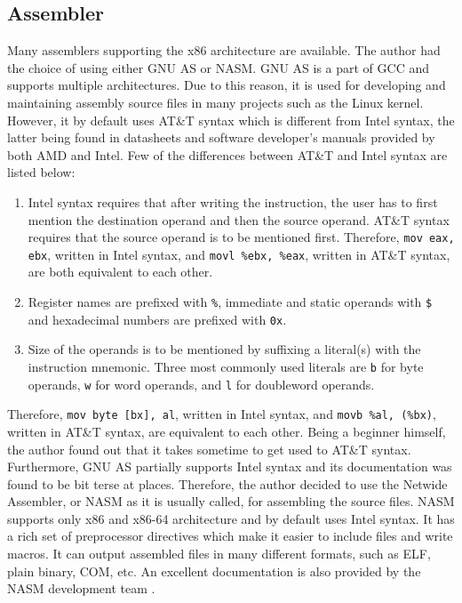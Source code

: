 \subsection{Assembler}
Many assemblers supporting the x86 architecture are available. The author had the choice of using either GNU AS or NASM. GNU AS is a part of GCC and supports multiple architectures. Due to this reason, it is used for developing and maintaining assembly source files in many projects such as the Linux kernel. However, it by default uses AT\&T syntax which is different from Intel syntax, the latter being found in datasheets and software developer's manuals provided by both AMD and Intel. Few of the differences between AT\&T and Intel syntax are listed below:
\begin{enumerate}
  \item Intel syntax requires that after writing the instruction, the user has to first mention the destination operand and then the source operand. AT\&T syntax requires that the source operand is to be mentioned first. Therefore, \texttt{mov eax, ebx}, written in Intel syntax, and \texttt{movl \%ebx, \%eax}, written in AT\&T syntax, are both equivalent to each other.
  \item Register names are prefixed with \verb|%|, immediate and static operands with \verb|$| and hexadecimal numbers are prefixed with \texttt{0x}.
  \item Size of the operands is to be mentioned by suffixing a literal(s) with the instruction mnemonic. Three most commonly used literals are \verb|b| for byte operands, \verb|w| for word operands, and \verb|l| for doubleword operands.  
\end{enumerate}
Therefore, \texttt{mov byte [bx], al}, written in Intel syntax, and \texttt{movb \%al, (\%bx)}, written in AT\&T syntax, are equivalent to each other. Being a beginner himself, the author found out that it takes sometime to get used to AT\&T syntax. Furthermore, GNU AS partially supports Intel syntax and its documentation was found to be bit terse at places. Therefore, the author decided to use the Netwide Assembler, or NASM as it is usually called, for assembling the source files. NASM supports only x86 and x86-64 architecture and by default uses Intel syntax. It has a rich set of preprocessor directives which make it easier to include files and write macros. It can output assembled files in many different formats, such as ELF, plain binary, COM, etc. An excellent documentation is also provided by the NASM development team \cite{nasm2015doc}.

